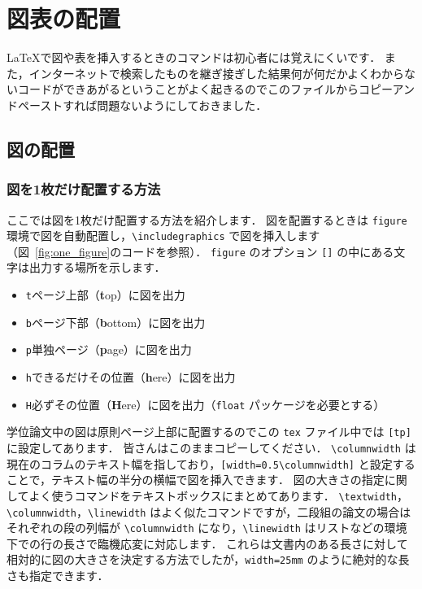 \chapter{図表の配置}
\label{ch:figure_table}

\LaTeX で図や表を挿入するときのコマンドは初心者には覚えにくいです．
また，インターネットで検索したものを継ぎ接ぎした結果何が何だかよくわからないコードができあがるということがよく起きるのでこのファイルからコピーアンドペーストすれば問題ないようにしておきました．

\section{図の配置}
\label{sec:figure}

\subsection{図を1枚だけ配置する方法}
\label{ssec:figure_sigle}

ここでは図を1枚だけ配置する方法を紹介します．
図を配置するときは \verb|figure| 環境で図を自動配置し，\verb|\includegraphics| で図を挿入します（図~\ref{fig:one_figure}のコードを参照）．
\verb|figure| のオプション \verb|[]| の中にある文字は出力する場所を示します．
\begin{itemize}
    \item \verb|t|\quad ページ上部（\textbf{t}op）に図を出力
    \item \verb|b|\quad ページ下部（\textbf{b}ottom）に図を出力
    \item \verb|p|\quad 単独ページ（\textbf{p}age）に図を出力
    \item \verb|h|\quad できるだけその位置（\textbf{h}ere）に図を出力
    \item \verb|H|\quad 必ずその位置（\textbf{H}ere）に図を出力（\verb|float| パッケージを必要とする）
\end{itemize}
学位論文中の図は原則ページ上部に配置するのでこの \verb|tex| ファイル中では \verb|[tp]| に設定してあります．
皆さんはこのままコピーしてください．
\verb|\columnwidth| は現在のコラムのテキスト幅を指しており，\verb|[width=0.5\columnwidth]| と設定することで，テキスト幅の半分の横幅で図を挿入できます．
図の大きさの指定に関してよく使うコマンドをテキストボックスにまとめてあります．
\verb|\textwidth|，\verb|\columnwidth|，\verb|\linewidth| はよく似たコマンドですが，二段組の論文の場合はそれぞれの段の列幅が \verb|\columnwidth| になり，\verb|\linewidth| はリストなどの環境下での行の長さで臨機応変に対応します．
これらは文書内のある長さに対して相対的に図の大きさを決定する方法でしたが，\verb|width=25mm| のように絶対的な長さも指定できます．

